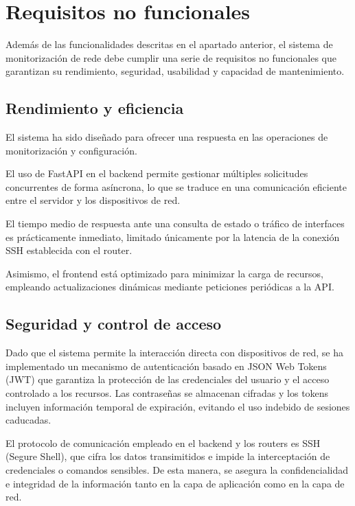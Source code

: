 \section{Requisitos no funcionales}

Además de las funcionalidades descritas en el apartado anterior, el sistema de monitorización de rede debe cumplir una serie de requisitos no funcionales que garantizan su rendimiento, seguridad, usabilidad y capacidad de mantenimiento.

\subsection*{Rendimiento y eficiencia}

El sistema ha sido diseñado para ofrecer una respuesta en las operaciones de monitorización y configuración.

El uso de FastAPI en el backend permite gestionar múltiples solicitudes concurrentes de forma asíncrona, lo que se traduce en una comunicación eficiente entre el servidor y los dispositivos de red.

El tiempo medio de respuesta ante una consulta de estado o tráfico de interfaces es prácticamente inmediato, limitado únicamente por la latencia de la conexión SSH establecida con el router.

Asimismo, el frontend está optimizado para minimizar la carga de recursos, empleando actualizaciones dinámicas mediante peticiones periódicas a la API.

\subsection*{Seguridad y control de acceso}

Dado que el sistema permite la interacción directa con dispositivos de red, se ha implementado un mecanismo de autenticación basado en JSON Web Tokens (JWT) que garantiza la protección de las credenciales del usuario y el acceso controlado a los recursos. Las contraseñas se almacenan cifradas y los tokens incluyen información temporal de expiración, evitando el uso indebido de sesiones caducadas.

El protocolo de comunicación empleado en el backend y los routers es SSH (Segure Shell), que cifra los datos transimitidos e impide la interceptación de credenciales o comandos sensibles. De esta manera, se asegura la confidencialidad e integridad de la información tanto en la capa de aplicación como en la capa de red.

